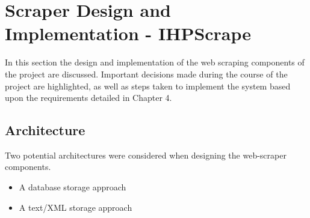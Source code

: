 \chapter{Scraper Design and Implementation - IHPScrape}\label{C:us}

In this section the design and implementation of the web scraping components of the project are discussed. Important decisions made during the course of the project are highlighted, as well as steps taken to implement the system based upon the requirements detailed in Chapter 4.







\section{Architecture}

Two potential architectures were considered when designing the web-scraper components.

\begin{itemize}
 \item A database storage approach
 \item A text/XML storage approach
\end{itemize}




